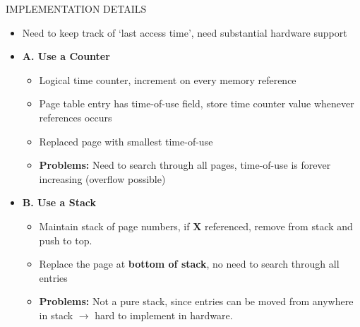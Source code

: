\documentclass[10pt,landscape]{article}
\begin{document}
\begin{multicols*}{3}
IMPLEMENTATION DETAILS
\begin{itemize}[topsep=0pt,noitemsep,wide=0pt, leftmargin=\dimexpr{} + 2\relax]
    \item Need to keep track of `last access time', need substantial hardware support
    \item \textbf{A. Use a Counter}
    \begin{itemize}[topsep=0pt,noitemsep,wide=0pt, leftmargin=\dimexpr{} + 2\relax]
        \item Logical time counter, increment on every memory reference
        \item Page table entry has time-of-use field, store time counter value whenever references occurs
        \item Replaced page with smallest time-of-use
        \item \textbf{Problems:} Need to search through all pages, time-of-use is forever increasing (overflow possible)
    \end{itemize}
    \item \textbf{B. Use a Stack}
    \begin{itemize}[topsep=0pt,noitemsep,wide=0pt, leftmargin=\dimexpr{} + 2\relax]
        \item Maintain stack of page numbers, if \textbf{X} referenced, remove from stack and push to top.
        \item Replace the page at \textbf{bottom of stack}, no need to search through all entries
        \item \textbf{Problems:} Not a pure stack, since entries can be moved from anywhere in stack $\rightarrow$ hard to implement in hardware.
    \end{itemize}
\end{itemize}


\end{multicols*}
\end{document}
